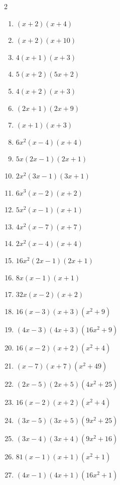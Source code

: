 \documentclass[11pt,oneside]{book}
\begin{document}
\begin{multicols}{2}
\begin{enumerate}[leftmargin=*,label=\textbf{B\arabic*.},itemsep=0.45\baselineskip]
\item $ \left(x + 2\right) \left(x + 4\right) $
\item $ \left(x + 2\right) \left(x + 10\right) $
\item $ 4 \left(x + 1\right) \left(x + 3\right) $
\item $ 5 \left(x + 2\right) \left(5 x + 2\right) $
\item $ 4 \left(x + 2\right) \left(x + 3\right) $
\item $ \left(2 x + 1\right) \left(2 x + 9\right) $
\item $ \left(x + 1\right) \left(x + 3\right) $
\item $ 6 x^{2} \left(x - 4\right) \left(x + 4\right) $
\item $ 5 x \left(2 x - 1\right) \left(2 x + 1\right) $
\item $ 2 x^{2} \left(3 x - 1\right) \left(3 x + 1\right) $
\item $ 6 x^{3} \left(x - 2\right) \left(x + 2\right) $
\item $ 5 x^{2} \left(x - 1\right) \left(x + 1\right) $
\item $ 4 x^{2} \left(x - 7\right) \left(x + 7\right) $
\item $ 2 x^{2} \left(x - 4\right) \left(x + 4\right) $
\item $ 16 x^{2} \left(2 x - 1\right) \left(2 x + 1\right) $
\item $ 8 x \left(x - 1\right) \left(x + 1\right) $
\item $ 32 x \left(x - 2\right) \left(x + 2\right) $
\item $ 16 \left(x - 3\right) \left(x + 3\right) \left(x^{2} + 9\right) $
\item $ \left(4 x - 3\right) \left(4 x + 3\right) \left(16 x^{2} + 9\right) $
\item $ 16 \left(x - 2\right) \left(x + 2\right) \left(x^{2} + 4\right) $
\item $ \left(x - 7\right) \left(x + 7\right) \left(x^{2} + 49\right) $
\item $ \left(2 x - 5\right) \left(2 x + 5\right) \left(4 x^{2} + 25\right) $
\item $ 16 \left(x - 2\right) \left(x + 2\right) \left(x^{2} + 4\right) $
\item $ \left(3 x - 5\right) \left(3 x + 5\right) \left(9 x^{2} + 25\right) $
\item $ \left(3 x - 4\right) \left(3 x + 4\right) \left(9 x^{2} + 16\right) $
\item $ 81 \left(x - 1\right) \left(x + 1\right) \left(x^{2} + 1\right) $
\item $ \left(4 x - 1\right) \left(4 x + 1\right) \left(16 x^{2} + 1\right) $
\end{enumerate}
\end{multicols}
\end{document}
